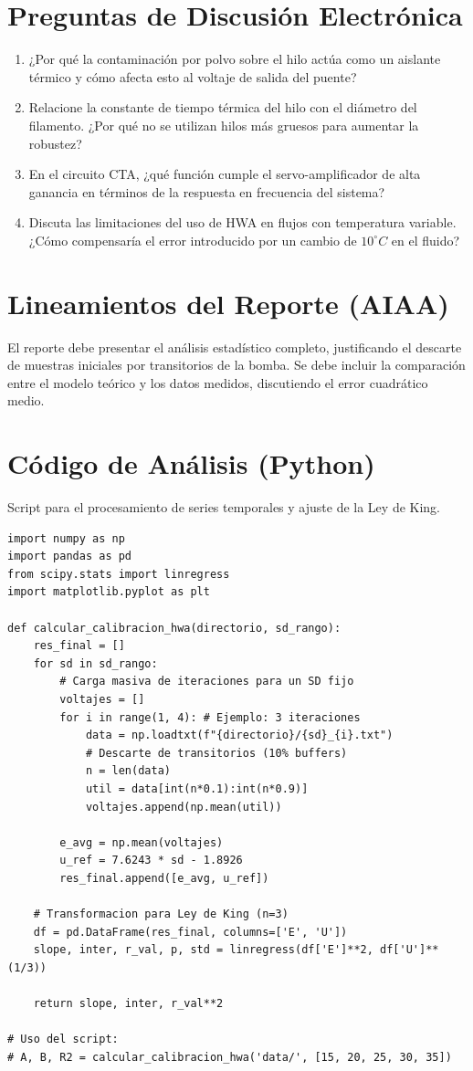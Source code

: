 \documentclass[11pt, a4paper]{article}
\begin{document}
\section{Preguntas de Discusión Electrónica}
\begin{enumerate}
    \item ¿Por qué la contaminación por polvo sobre el hilo actúa como un aislante térmico y cómo afecta esto al voltaje de salida del puente?
    \item Relacione la constante de tiempo térmica del hilo con el diámetro del filamento. ¿Por qué no se utilizan hilos más gruesos para aumentar la robustez?
    \item En el circuito CTA, ¿qué función cumple el servo-amplificador de alta ganancia en términos de la respuesta en frecuencia del sistema?
    \item Discuta las limitaciones del uso de HWA en flujos con temperatura variable. ¿Cómo compensaría el error introducido por un cambio de $10^\circ C$ en el fluido?
\end{enumerate}

\section{Lineamientos del Reporte (AIAA)}
El reporte debe presentar el análisis estadístico completo, justificando el descarte de muestras iniciales por transitorios de la bomba. Se debe incluir la comparación entre el modelo teórico y los datos medidos, discutiendo el error cuadrático medio.

\newpage
\appendix
\section{Código de Análisis (Python)}
Script para el procesamiento de series temporales y ajuste de la Ley de King.

\begin{lstlisting}
import numpy as np
import pandas as pd
from scipy.stats import linregress
import matplotlib.pyplot as plt

def calcular_calibracion_hwa(directorio, sd_rango):
    res_final = []
    for sd in sd_rango:
        # Carga masiva de iteraciones para un SD fijo
        voltajes = []
        for i in range(1, 4): # Ejemplo: 3 iteraciones
            data = np.loadtxt(f"{directorio}/{sd}_{i}.txt")
            # Descarte de transitorios (10% buffers)
            n = len(data)
            util = data[int(n*0.1):int(n*0.9)]
            voltajes.append(np.mean(util))
        
        e_avg = np.mean(voltajes)
        u_ref = 7.6243 * sd - 1.8926
        res_final.append([e_avg, u_ref])
    
    # Transformacion para Ley de King (n=3)
    df = pd.DataFrame(res_final, columns=['E', 'U'])
    slope, inter, r_val, p, std = linregress(df['E']**2, df['U']**(1/3))
    
    return slope, inter, r_val**2

# Uso del script:
# A, B, R2 = calcular_calibracion_hwa('data/', [15, 20, 25, 30, 35])
\end{lstlisting}
\end{document}
